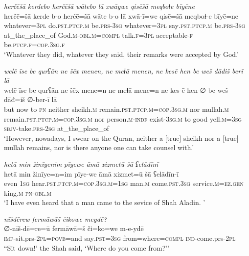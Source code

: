 \ea \label{ZB.59}
\textit{herčēšā kerdebo herčēšā wātebo lā xwāywe qisēšā meqboɫe bīyēne} \\ 
\gll herčē=šā kerde b-o herčē=šā wāte b-o lā xwā-ī=we qisē=šā meqboɫ-e bīyē=ne \\ 
 whatever\textsc{=3pl} do\textsc{.pst}\textsc{.ptcp}\textsc{.m} be\textsc{.prs}\textsc{-3sg} whatever\textsc{=3pl} say\textsc{.pst}\textsc{.ptcp}\textsc{.m} be\textsc{.prs}\textsc{-3sg} at\_the\_place\_of God\textsc{.m}\textsc{-obl}\textsc{.m}\textsc{=compl} talk\textsc{.f}\textsc{=3pl} acceptable\textsc{-f} be\textsc{.ptcp}\textsc{.f}\textsc{=cop}\textsc{.3sg}\textsc{.f} \\ 
\glt `Whatever they did, whatever they said, their remarks were accepted by God.'
\z 
 
\ea \label{ZB.60}
\textit{welē īse be qurʕān ne šēx menen, ne meɫā menen, ne kesē hen be weš dāđiš berī lā} \\ 
\gll welē īse be qurʕān ne šēx mene=n ne meɫā mene=n ne kes-ē hen-∅ be weš dāđ=iš ∅-ber-ī lā \\ 
 but now to \textsc{pn} neither sheikh\textsc{.m} remain\textsc{.pst}\textsc{.ptcp}\textsc{.m}\textsc{=cop}\textsc{.3sg}\textsc{.m} nor mullah\textsc{.m} remain\textsc{.pst}\textsc{.ptcp}\textsc{.m}\textsc{=cop}\textsc{.3sg}\textsc{.m} nor person\textsc{.m}\textsc{-indf} exist\textsc{-3sg}\textsc{.m} to good yell\textsc{.m}\textsc{=3sg} \textsc{sbjv-}take\textsc{.prs}-\textsc{2sg} at\_the\_place\_of \\ 
\glt `However, nowadays, I swear on the Quran, neither a [true] sheikh nor a [true] mullah remains, nor is there anyone one can take counsel with.'
\z 
 
\ea \label{ZQ.2}
\textit{hetā min žinīyenim pīyewe āmā xizmetū šā ʕelādīnī} \\ 
\gll hetā min žinīye=n=im pīye-we āmā xizmet=ū šā ʕelādīn-ī \\ 
 even \textsc{1sg} hear\textsc{.pst}\textsc{.ptcp}\textsc{.m}\textsc{=cop}\textsc{.3sg}\textsc{.m}\textsc{=\textsc{1sg}} man\textsc{.m} come\textsc{.pst}\textsc{.3sg} service\textsc{.m}\textsc{=ez.gen} king\textsc{.m} \textsc{pn}\textsc{-obl}\textsc{.m} \\ 
\glt `I have even heard that a man came to the sevice of Shah Aladin. '
\z 
 
\ea \label{ZQ.4}
\textit{nīšdērew fermāwāš čikowe meydē?} \\ 
\gll ∅-nīš-dē=re=ū fermāwā=š či=ko=we m-e-ydē \\ 
 \textsc{imp-}sit.prs-\textsc{2pl}\textsc{=\textsc{povb}}=and say\textsc{.pst}\textsc{=3sg} from=where\textsc{=compl} \textsc{ind-}come.prs-\textsc{2pl} \\ 
\glt ``Sit down!' the Shah said, ‘Where do you come from?’'
\z 
 
